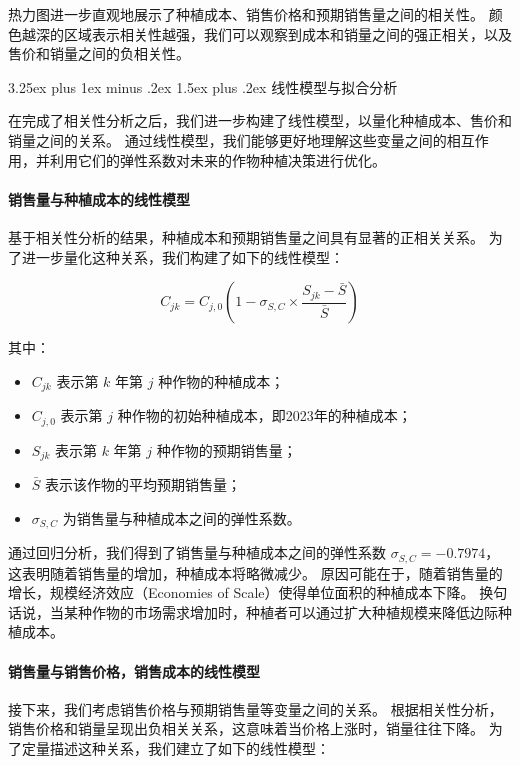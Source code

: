 \documentclass[12pt,a4paper]{nmmcm}
\makeatletter
\renewcommand\subsection{\@startsection{subsection}{2}{0pt}%
    {3.25ex plus 1ex minus .2ex}%
    {1.5ex plus .2ex}%
    {\normalfont\Large\bfseries}}
\makeatother
\begin{document}
热力图进一步直观地展示了种植成本、销售价格和预期销售量之间的相关性。
颜色越深的区域表示相关性越强，我们可以观察到成本和销量之间的强正相关，以及售价和销量之间的负相关性。


\subsection{线性模型与拟合分析}

在完成了相关性分析之后，我们进一步构建了线性模型，以量化种植成本、售价和销量之间的关系。
通过线性模型，我们能够更好地理解这些变量之间的相互作用，并利用它们的弹性系数对未来的作物种植决策进行优化。


\paragraph{销售量与种植成本的线性模型}

基于相关性分析的结果，种植成本和预期销售量之间具有显著的正相关关系。
为了进一步量化这种关系，我们构建了如下的线性模型：

\[
  C_{jk} = C_{j,0} \left(1 - \sigma_{S,C} \times \frac{S_{jk} - \bar{S}}{\bar{S}} \right)
\]

其中：
\begin{itemize}
  \item $C_{jk}$ 表示第 $k$ 年第 $j$ 种作物的种植成本；
  \item $C_{j,0}$ 表示第 $j$ 种作物的初始种植成本，即2023年的种植成本；
  \item $S_{jk}$ 表示第 $k$ 年第 $j$ 种作物的预期销售量；
  \item $\bar{S}$ 表示该作物的平均预期销售量；
  \item $\sigma_{S,C}$ 为销售量与种植成本之间的弹性系数。

\end{itemize}

通过回归分析，我们得到了销售量与种植成本之间的弹性系数 $\sigma_{S,C} = -0.7974$，这表明随着销售量的增加，种植成本将略微减少。
原因可能在于，随着销售量的增长，规模经济效应（Economies of Scale）使得单位面积的种植成本下降。
换句话说，当某种作物的市场需求增加时，种植者可以通过扩大种植规模来降低边际种植成本。


\paragraph{销售量与销售价格，销售成本的线性模型}

接下来，我们考虑销售价格与预期销售量等变量之间的关系。
根据相关性分析，销售价格和销量呈现出负相关关系，这意味着当价格上涨时，销量往往下降。
为了定量描述这种关系，我们建立了如下的线性模型：
\end{document}
